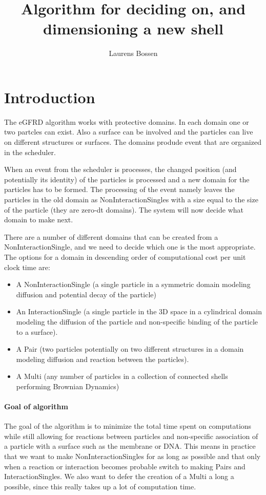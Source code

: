 \documentclass[a4paper,11pt]{article}
\title{Algorithm for deciding on, and dimensioning a new shell}
\author{Laurens Bossen}
\begin{document}
\maketitle

\section{Introduction}
The eGFRD algorithm works with protective domains. In each domain one or two partcles can exist. Also a surface can be
involved and the particles can live on different structures or surfaces. The domains produde event that are organized
in the scheduler.

When an event from the scheduler is processes, the changed position (and potentially its identity) of the particles is
processed and a new domain for the particles has to be formed. The processing of the event
namely leaves the particles in the old domain as NonInteractionSingles with a size equal to the size of the particle
(they are zero-dt domains). The system will now decide what domain to make next.

There are a number of different domains that can be created from a NonInteractionSingle, and we need to decide which one is
the most appropriate. The options for a domain in descending order of computational cost per unit clock time are:
\begin{itemize}
 \item A NonInteractionSingle (a single particle in a symmetric domain modeling diffusion and potential decay of the
			       particle)
 \item An InteractionSingle (a single particle in the 3D space in a cylindrical domain modeling the diffusion of the particle
			     and non-specific binding of the particle to a surface).
 \item A Pair (two particles potentially on two different structures in a domain modeling diffusion and reaction between
	       the particles).
 \item A Multi (any number of particles in a collection of connected shells performing Brownian Dynamics)
\end{itemize}

\paragraph{Goal of algorithm}
The goal of the algorithm is to minimize the total time spent on computations while still allowing for reactions between
particles and non-specific association of a particle with a surface such as the membrane or DNA. This means in practice
that we want to make NonInteractionSingles for as long as possible and that only when a reaction or interaction becomes
probable switch to
making Pairs and InteractionSingles. We also want to defer the creation of a Multi a long a possible, since this really
takes up a lot of computation time.
\end{document}
